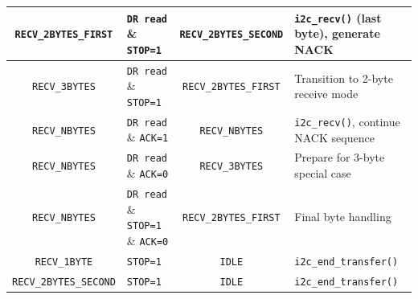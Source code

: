 \begin{table}[H]
\begin{tabularx}{\textwidth}{|c|X|c|X|}
        \hline
        \texttt{RECV\_2BYTES\_FIRST} & \texttt{DR read} \& \texttt{STOP=1} & \texttt{RECV\_2BYTES\_SECOND} & \texttt{i2c\_recv()} (last byte), generate NACK \\
        \hline
        \texttt{RECV\_3BYTES} & \texttt{DR read} \& \texttt{STOP=1} & \texttt{RECV\_2BYTES\_FIRST} & Transition to 2-byte receive mode \\
        \hline
        \texttt{RECV\_NBYTES} & \texttt{DR read} \& \texttt{ACK=1} & \texttt{RECV\_NBYTES} & \texttt{i2c\_recv()}, continue NACK sequence \\
        \hline
        \texttt{RECV\_NBYTES} & \texttt{DR read} \& \texttt{ACK=0} & \texttt{RECV\_3BYTES} & Prepare for 3-byte special case \\
        \hline
        \texttt{RECV\_NBYTES} & \texttt{DR read} \& \texttt{STOP=1} \& \texttt{ACK=0} & \texttt{RECV\_2BYTES\_FIRST} & Final byte handling \\
        \hline
        \texttt{RECV\_1BYTE} & \texttt{STOP=1} & \texttt{IDLE} & \texttt{i2c\_end\_transfer()} \\
        \hline
        \texttt{RECV\_2BYTES\_SECOND} & \texttt{STOP=1} & \texttt{IDLE} & \texttt{i2c\_end\_transfer()} \\
        \hline
    \end{tabularx}




\end{table}
